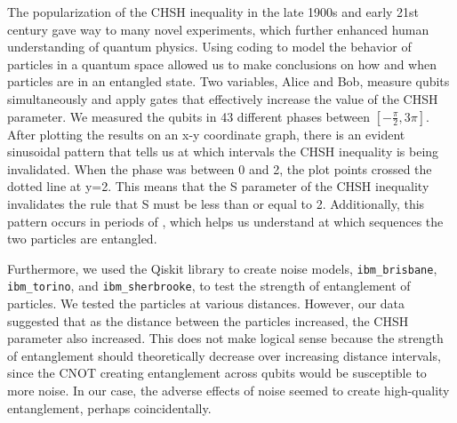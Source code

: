 \documentclass{article}
\begin{document}
The popularization of the CHSH inequality in the late 1900s and early 21st century gave way to many novel experiments, which further enhanced human understanding of quantum physics. Using coding to model the behavior of particles in a quantum space allowed us to make conclusions on how and when particles are in an entangled state. Two variables, Alice and Bob, measure qubits simultaneously and apply gates that effectively increase the value of the CHSH parameter. We measured the qubits in 43 different phases between $[-\frac\pi2, 3\pi]$. After plotting the results on an x-y coordinate graph, there is an evident sinusoidal pattern that tells us at which intervals the CHSH inequality is being invalidated. When the phase was between 0 and 2, the plot points crossed the dotted line at y=2. This means that the S parameter of the CHSH inequality invalidates the rule that S must be less than or equal to 2. Additionally, this pattern occurs in periods of , which helps us understand at which sequences the two particles are entangled. 

Furthermore, we used the Qiskit library to create noise models, \verb|ibm_brisbane|, \verb|ibm_torino|, and \verb|ibm_sherbrooke|, to test the strength of entanglement of particles. We tested the particles at various distances. However, our data suggested that as the distance between the particles increased, the CHSH parameter also increased. This does not make logical sense because the strength of entanglement should theoretically decrease over increasing distance intervals, since the CNOT creating entanglement across qubits would be susceptible to more noise. In our case, the adverse effects of noise seemed to create high-quality entanglement, perhaps coincidentally. 



\newpage

\end{document}
